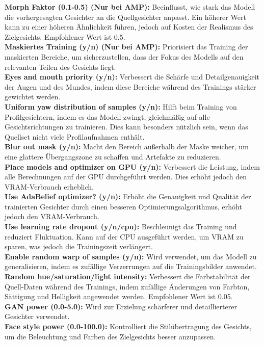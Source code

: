 \textbf{Morph Faktor (0.1-0.5) (Nur bei AMP):} Beeinflusst, wie stark das Modell die vorhergesagten Gesichter an die Quellgesichter anpasst.
Ein höherer Wert kann zu einer höheren Ähnlichkeit führen, jedoch auf Kosten der Realismus des Zielgesichts.
Empfohlener Wert ist 0.5.\\
\textbf{Maskiertes Training (y/n) (Nur bei AMP):} Priorisiert das Training der maskierten Bereiche, um sicherzustellen, dass der Fokus des Modells auf den relevanten Teilen des Gesichts liegt.\\
\textbf{Eyes and mouth priority (y/n):} Verbessert die Schärfe und Detailgenauigkeit der Augen und des Mundes, indem diese Bereiche während des Trainings stärker gewichtet werden.\\
\textbf{Uniform yaw distribution of samples (y/n):} Hilft beim Training von Profilgesichtern, indem es das Modell zwingt, gleichmäßig auf alle Gesichtsrichtungen zu trainieren.
Dies kann besonders nützlich sein, wenn das Quellset nicht viele Profilaufnahmen enthält.\\
\textbf{Blur out mask (y/n):} Macht den Bereich außerhalb der Maske weicher, um eine glattere Übergangszone zu schaffen und Artefakte zu reduzieren.\\
\textbf{Place models and optimizer on GPU (y/n):} Verbessert die Leistung, indem alle Berechnungen auf der GPU durchgeführt werden.
Dies erhöht jedoch den VRAM-Verbrauch erheblich.\\
\textbf{Use AdaBelief optimizer? (y/n):} Erhöht die Genauigkeit und Qualität der trainierten Gesichter durch einen besseren Optimierungsalgorithmus, erhöht jedoch den VRAM-Verbrauch.\\
\textbf{Use learning rate dropout (y/n/cpu):} Beschleunigt das Training und reduziert Fluktuation.
Kann auf der CPU ausgeführt werden, um VRAM zu sparen, was jedoch die Trainingszeit verlängert.\\
\textbf{Enable random warp of samples (y/n):} Wird verwendet, um das Modell zu generalisieren, indem es zufällige Verzerrungen auf die Trainingsbilder anwendet.\\
\textbf{Random hue/saturation/light intensity:} Verbessert die Farbstabilität der Quell-Daten während des Trainings, indem zufällige Änderungen von Farbton, Sättigung und Helligkeit angewendet werden.
Empfohlener Wert ist 0.05.\\
\textbf{GAN power (0.0-5.0):} Wird zur Erzielung schärferer und detaillierterer Gesichter verwendet.\\
\textbf{Face style power (0.0-100.0):} Kontrolliert die Stilübertragung des Gesichts, um die Beleuchtung und Farben des Zielgesichts besser anzupassen.\\
